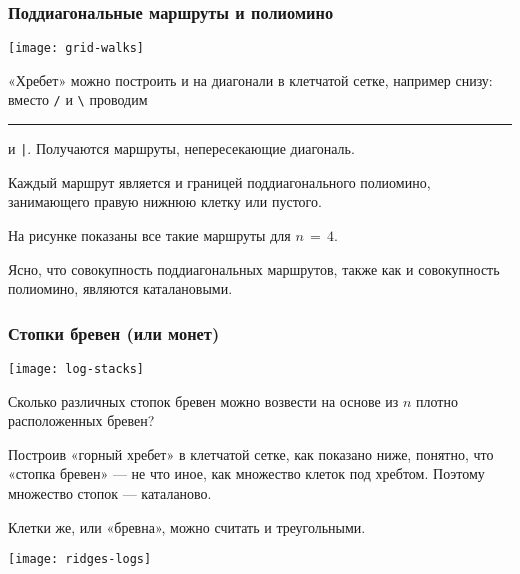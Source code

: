 \documentclass[mathserif]{beamer}
\begin{document}
\begin{frame}[fragile]%
\frametitle{Поддиагональные маршруты и полиомино}
\centerline{\texttt{[image: grid-walks]}}

\bigskip

«Хребет» можно построить и на диагонали в клетчатой сетке, например снизу: вместо \verb./. и \verb.\. проводим \rule{1.9ex}{.15ex} и \verb.|..
Получаются маршруты, непересекающие диагональ.

\medskip

Каждый маршрут является и границей поддиагонального полиомино, занимающего правую нижнюю клетку или пустого.

\medskip

На рисунке показаны все такие маршруты для $n\,{=}\,4$.

\medskip

Ясно, что совокупность поддиагональных маршрутов, также как и совокупность полиомино, являются каталановыми.
\end{frame}

\begin{frame}[fragile]%
\frametitle{Стопки бревен (или монет)}
\centerline{\texttt{[image: log-stacks]}}

\bigskip
\medskip

Сколько различных стопок бревен можно возвести на основе из $n$ плотно расположенных бревен?

\medskip

Построив «горный хребет» в клетчатой сетке, как показано ниже, понятно, что «стопка бревен» — не что иное, как множество клеток под хребтом.
Поэтому множество стопок — каталаново.

\medskip

Клетки же, или «бревна», можно считать и треугольными.

\bigskip

\centerline{\texttt{[image: ridges-logs]}}
\end{frame}
\end{document}
